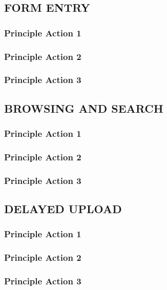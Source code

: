 \documentclass[twoside,letterpaper]{article}
\begin{document}
{\subsection[FORM ENTRY]{\rmfamily\bfseries\color{black}
FORM ENTRY}
\subsubsection{Principle Action 1}
\subsubsection{Principle Action 2}
\subsubsection{Principle Action 3}

\subsection[BROWSING AND SEARCH]{\rmfamily\bfseries\color{black}
BROWSING AND SEARCH}
\subsubsection{Principle Action 1}
\subsubsection{Principle Action 2}
\subsubsection{Principle Action 3}

\subsection[DELAYED UPLOAD]{\rmfamily\bfseries\color{black}
DELAYED UPLOAD}
\subsubsection{Principle Action 1}
\subsubsection{Principle Action 2}
\subsubsection{Principle Action 3}


}
\end{document}
